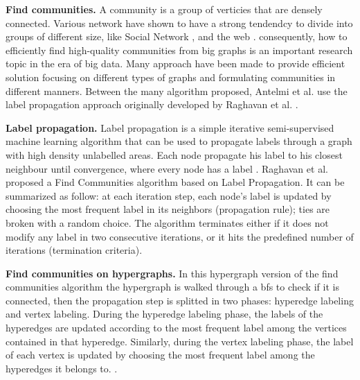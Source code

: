 \documentclass[conference]{IEEEtran}
\newcommand{\mypar}[1]{{\bf #1.}}
\begin{document}
\mypar{Find communities}
A community is a group of verticies that are densely connected. Various network have shown to have a strong tendendcy to divide into groups of different size, like Social Network \cite{community_social}, and the web \cite{community_web}.
consequently, how to efficiently find high-quality  communities from big graphs is an important research topic in the era of big data. Many approach have been made to provide efficient solution focusing on different types of graphs and formulating communities in different manners.
Between the many algorithm proposed, Antelmi et al. use the label propagation approach originally developed by Raghavan et al. \cite{SimpleHypergraphs}.

\mypar{Label propagation}
Label propagation is a simple iterative semi-supervised machine learning algorithm that can be used to propagate labels through a graph with high density unlabelled areas. Each node propagate his label to his closest neighbour until convergence, where every node has a label \cite{LabelPropagation}.
Raghavan et al. proposed a Find Communities algorithm based on Label Propagation. It can be summarized as follow: at each iteration step,
each node’s label is updated by choosing the most frequent label in its neighbors (propagation rule); ties are broken with a random choice. The algorithm terminates either if it does not modify any label in two consecutive iterations, or it hits the predefined number of iterations (termination criteria). \cite{LabelPropagation}

\mypar{Find communities on hypergraphs}
In this hypergraph version of the find communities algorithm the hypergraph is walked through a bfs to check if it is connected, then the propagation step is splitted in two phases: hyperedge labeling and vertex labeling. During the hyperedge labeling phase, the labels of the
hyperedges are updated according to the most frequent label among the vertices contained in that hyperedge. Similarly, during the vertex labeling phase, the label of each vertex is updated by choosing the most frequent label among the hyperedges it belongs to. \cite{SimpleHypergraphs}.
\end{document}
